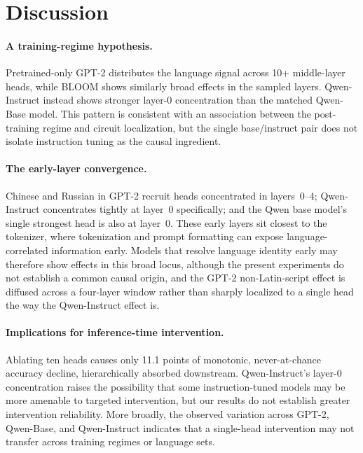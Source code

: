 \documentclass[11pt]{article}
\begin{document}
\section{Discussion}
\label{sec:discussion}

\paragraph{A training-regime hypothesis.} Pretrained-only GPT-2 distributes
the language signal across 10+ middle-layer heads, while BLOOM shows similarly
broad effects in the sampled layers. Qwen-Instruct instead shows stronger
layer-0 concentration than the matched Qwen-Base model. This pattern is
consistent with an association between the post-training regime and circuit
localization, but the single base/instruct pair does not isolate instruction
tuning as the causal ingredient.

\paragraph{The early-layer convergence.} Chinese and Russian in GPT-2
recruit heads concentrated in layers~0--4; Qwen-Instruct concentrates
tightly at layer~0 specifically; and the Qwen base model's single
strongest head is also at layer~0. These early layers sit closest to
the tokenizer, where tokenization and prompt formatting can expose
language-correlated information early. Models that resolve language identity
early may therefore show effects in this broad locus, although the present
experiments do not establish a common causal origin, and the GPT-2
non-Latin-script effect is diffused across a four-layer window rather
than sharply localized to a single head the way the Qwen-Instruct
effect is.

\paragraph{Implications for inference-time intervention.} Ablating
ten heads causes only 11.1 points of monotonic, never-at-chance
accuracy decline, hierarchically absorbed downstream. Qwen-Instruct's layer-0 concentration raises the possibility that some
instruction-tuned models may be more amenable to targeted intervention, but
our results do not establish greater intervention reliability. More broadly,
the observed variation across GPT-2, Qwen-Base, and Qwen-Instruct indicates
that a single-head intervention may not transfer across training regimes or
language sets.
\end{document}
